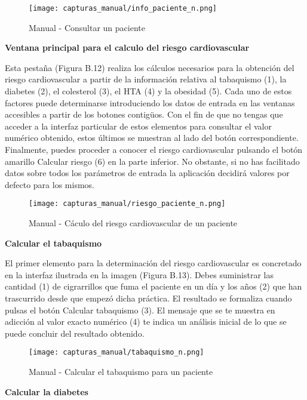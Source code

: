 \documentclass[11pt,spanish,
		listoftables,listoffigures]
		{tfgplantilla}
\begin{document}
\begin{figure}[H]
\centering
\texttt{[image: capturas\_manual/info\_paciente\_n.png]}
\caption{Manual - Consultar un paciente}
\end{figure}

\textbf {Ventana principal para el calculo del riesgo cardiovascular}

Esta pestaña (Figura B.12) realiza los cálculos necesarios para la obtención del riesgo cardiovascular a partir de la información relativa al tabaquismo (1), la diabetes (2), el colesterol (3), el HTA (4) y la obesidad (5). Cada uno de estos factores puede determinarse introduciendo los datos de entrada en las ventanas accesibles a partir de los botones contigüos. Con el fin de que no tengas que acceder a la interfaz particular de estos elementos para consultar el valor numérico obtenido, estos últimos se muestran al lado del botón correspondiente. Finalmente, puedes proceder a conocer el riesgo cardiovascular pulsando el botón amarillo \textquotedbl Calcular riesgo\textquotedbl{} (6) en la parte inferior. No obstante, si no has facilitado datos sobre todos los parámetros de entrada la aplicación decidirá valores por defecto para los mismos.

\begin{figure}[H]
\centering
\texttt{[image: capturas\_manual/riesgo\_paciente\_n.png]}
\caption{Manual - Cáculo del riesgo cardiovascular de un paciente}
\end{figure}

\textbf {Calcular el tabaquismo}

El primer elemento para la determinación del riesgo cardiovascular es concretado en la interfaz ilustrada en la imagen (Figura B.13). Debes suministrar las cantidad (1) de cigrarrillos que fuma el paciente en un día y los años (2) que han trascurrido desde que empezó dicha práctica. El resultado se formaliza cuando pulsas el botón \textquotedbl Calcular tabaquismo\textquotedbl{} (3). El mensaje que se te muestra en adicción al valor exacto numérico (4) te indica un análisis inicial de lo que se puede concluir del resultado obtenido.

\begin{figure}[H]
\centering
\texttt{[image: capturas\_manual/tabaquismo\_n.png]}
\caption{Manual - Calcular el tabaquismo para un paciente}
\end{figure}

\textbf {Calcular la diabetes}
\end{document}
